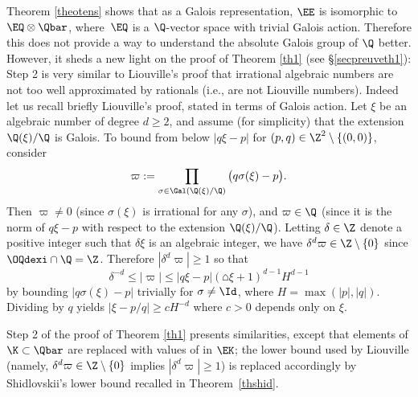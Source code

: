 Theorem \ref{theotens} shows that as a Galois representation, $\EE$ is isomorphic to $\EQ\otimes \Qbar$, where~$\EQ$ is a $\Q$-vector space with trivial Galois action. Therefore this does not provide a way to understand the absolute Galois group of $\Q$ better. However, it sheds a new light on the proof of Theorem \ref{th1} (see \S \ref{secpreuveth1}): Step 2 is very similar to Liouville's proof that irrational algebraic numbers are not too well approximated by rationals (i.e., are not Liouville numbers).
Indeed let us recall briefly Liouville's proof, stated in terms of Galois action. Let $\xi$ be an algebraic number of degree $d\geq 2$, and assume (for simplicity) that the extension $\Q(\xi)/\Q$ is Galois. To bound from below $| q\xi-p|$ for $(p,q)\in\Z^2\setminus\{(0,0)\}$, consider\vspace*{-3pt}
\[
\varpi := \prod_{\sigma\in \Gal(\Q(\xi)/\Q)} \big( q \sigma(\xi)-p\big).
\]
Then $\varpi\neq 0$ (since $\sigma(\xi)$ is irrational for any $\sigma$), and $\varpi\in\Q$ (since it is the norm of $ q\xi-p $ with respect to the extension $\Q(\xi)/\Q$). Letting $\delta\in\Z$ denote a positive integer such that $\delta \xi$ is an algebraic integer, we have $\delta^d \varpi\in\Z\setminus\{0\}$ since $\OQdexi\cap\Q=\Z$. Therefore $|\delta^d\varpi |\geq 1 $ so that
\[
\delta^{-d} \leq | \varpi | \leq | q\xi-p| (\house{\xi}+1)^{d-1} H^{d-1}
\]
by bounding $| q \sigma(\xi)-p|$ trivially for $\sigma\neq \Id$, where $H = \max(|p|,|q|)$. Dividing by $q$ yields $| \xi-p/q|\geq c H^{-d}$ where $c>0$ depends only on $\xi$.

Step 2 of the proof of Theorem \ref{th1} presents similarities, except that elements of $\K\subset \Qbar$ are replaced with values of \Efunctions in $\EK$; the lower bound used by Liouville (namely, $\delta^d \varpi\in\Z\setminus\{0\}$ implies $|\delta^d \varpi|\geq 1 $) is replaced accordingly by Shidlovskii's lower bound recalled in Theorem~\ref{thshid}.

